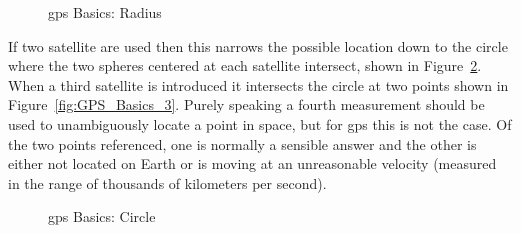 \begin{figure}
  \centering
  \caption{\ac{gps} Basics: Radius}
	\label{fig:GPS_Basics_1}
\end{figure}

If two satellite are used then this narrows the possible location down to the circle where the two spheres centered at each satellite intersect, shown in Figure~\ref{fig:GPS_Basics_2}. When a third satellite is introduced it intersects the circle at two points shown in Figure~\ref{fig:GPS_Basics_3}. Purely speaking a fourth measurement should be used to unambiguously locate a point in space, but for \ac{gps} this is not the case.  Of the two points referenced, one is normally a sensible answer and the other is either not located on Earth or is moving at an unreasonable velocity (measured in the range of thousands of kilometers per second).

\begin{figure}
	\centering
	\caption{\ac{gps} Basics: Circle}
	\label{fig:GPS_Basics_2}
\end{figure}


